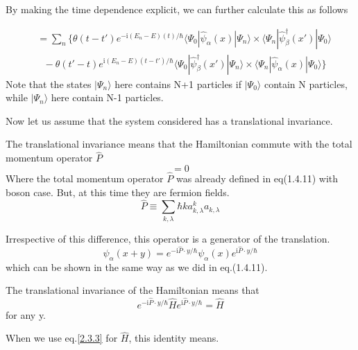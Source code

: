 By making the time dependence explicit, we can further calculate this as follows

\begin{align}
&=\sum_n\{\theta(t-t')e^{-\mathrm{i}(E_n-E)(t)/\hbar}\langle\Psi_0|\hat \psi_{\alpha}(x)|\Psi_n\rangle\times\langle\Psi_n|\hat \psi^{
\dagger}_{\beta} (x')|\Psi_0\rangle \nonumber \\
& \ \ \ -\theta(t'-t)e^{\mathrm{i}(E_n-E)(t-t')/\hbar}\langle\Psi_0|\hat \psi^{
\dagger}_{\beta}(x')|\Psi_n\rangle\times\langle\Psi_n|\hat \psi_{\alpha} (x)|\Psi_0\rangle\} \nonumber
\end{align}
Note that the states $|\Psi_n\rangle$ here contains N+1 particles if $|\Psi_0\rangle$ contain N particles, while $|\Psi_n\rangle$ here contain N-1 particles.

Now let us assume that the system considered has a translational invariance.

The translational invariance means that the Hamiltonian commute with the total momentum operator $\hat{P}$
\begin{equation}
[\hat{H},\hat{P}]=0\label{2.3.8}
\end{equation}
Where the total momentum operator $\hat{P}$ was already defined in eq(1.4.11) with boson case. But, at this time they are fermion fields.
\begin{equation}
\hat{P}\equiv \sum_{k,\lambda} \hbar k a^k_{k,\lambda} a_{k,\lambda} \nonumber
\end{equation}

Irrespective of this difference, this operator is a generator of the translation.
\begin{equation}\label{2.3.9}
\psi_{\alpha}(x+y)=e^{-\mathrm{i}\hat{P}\cdot y/\hbar}\psi_{\alpha}(x)e^{\mathrm{i}\hat{P}\cdot y/\hbar}
\end{equation}
which can be shown in the same way as we did in eq.(1.4.11).

The translational invariance of the Hamiltonian means that 
\begin{equation}\label{2.3.10}
e^{-\mathrm{i}\hat{P}\cdot y/\hbar}\hat{H}e^{\mathrm{i}\hat{P}\cdot y/\hbar}=\hat{H}
\end{equation}
for any y.

When we use eq.\eqref{2.3.3} for $\hat{H}$, this identity means.

